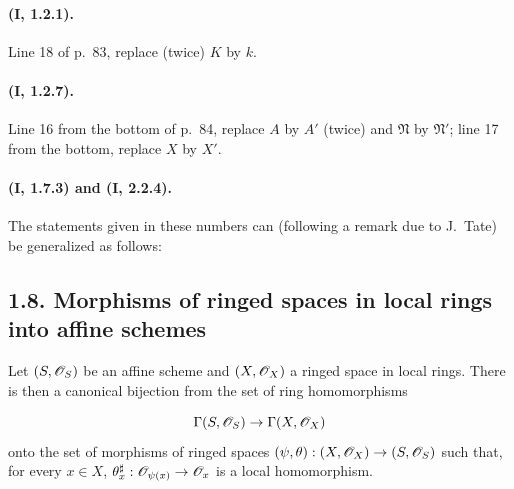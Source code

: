 \paragraph{(I, 1.2.1).}
Line 18 of p.~83, replace (twice) $K$ by $k$.

\paragraph{(I, 1.2.7).}
Line 16 from the bottom of p.~84, replace $A$ by $A'$ (twice) and
$\mathfrak N$ by $\mathfrak N'$; line 17 from the bottom, replace $X$ by
$X'$.

\paragraph{(I, 1.7.3) and (I, 2.2.4).}
The statements given in these numbers can (following a remark due to
J.~Tate) be generalized as follows:

\subsection*{1.8. Morphisms of ringed spaces in local rings into affine schemes}
\label{ega2:addendum:subsection:I.1.8}

\begin{proposition}[1.8.1]
\label{ega2:addendum:I.1.8.1}
Let $(S,\mathscr{O}_S)$ be an affine scheme and $(X,\mathscr{O}_X)$ a ringed space
in local rings. There is then a canonical bijection from the set
of ring homomorphisms
\[
  \Gamma(S,\mathscr{O}_S)\to\Gamma(X,\mathscr{O}_X)
\]
onto the set of morphisms of ringed spaces
$(\psi,\theta):(X,\mathscr{O}_X)\to(S,\mathscr{O}_S)$ such that, for every
$x\in X$, $\theta_x^\sharp:\mathscr{O}_{\psi(x)}\to\mathscr{O}_x$ is a
local homomorphism.
\end{proposition}

